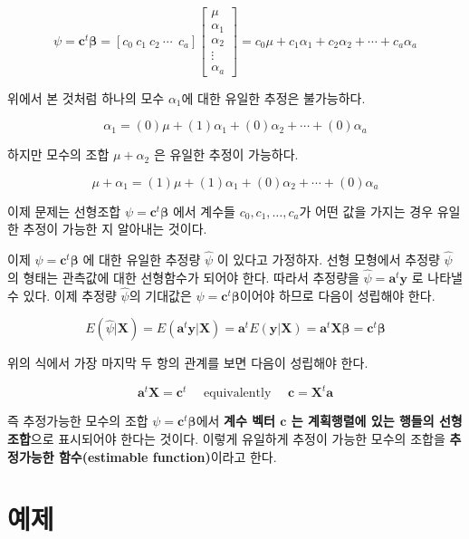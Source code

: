 \documentclass[
]{book}
\newcommand{\bm}[1]{\boldsymbol{\mathbf{#1}}}
\begin{document}
\[ \psi = \bm c^t \bm \beta = 
[ c_0~ c_1~ c_2~ \cdots~~c_a] 
\begin{bmatrix}
\mu \\
\alpha_1 \\
\alpha_2 \\
\vdots \\
\alpha_a
\end{bmatrix}
=c_0 \mu + c_1 \alpha_1 + c_2 \alpha_2 + \cdots + c_a \alpha_a \]

위에서 본 것처럼 하나의 모수 \(\alpha_1\)에 대한 유일한 추정은 불가능하다.

\[  \alpha_1 = (0) \mu + (1) \alpha_1 + (0) \alpha_2 + \cdots + (0) \alpha_a \]

하지만 모수의 조합 \(\mu+ \alpha_2\) 은 유일한 추정이 가능하다.

\[  \mu + \alpha_1 = (1) \mu + (1) \alpha_1 + (0) \alpha_2 + \cdots + (0) \alpha_a \]

이제 문제는 선형조합 \(\psi= \bm c^t \bm \beta\) 에서 계수들 \(c_0, c_1, \dots, c_a\)가 어떤 값을 가지는 경우 유일한 추정이 가능한 지 알아내는 것이다.

이제 \(\psi = \bm c^t \bm \beta\) 에 대한 유일한 추정량 \(\hat \psi\) 이 있다고 가정하자. 선형 모형에서 추정량 \(\hat \psi\)의 형태는 관측값에 대한 선형함수가 되어야 한다. 따라서 추정량을 \(\hat \psi = \bm a^t \bm y\) 로 나타낼 수 있다. 이제 추정량 \(\hat \psi\)의 기대값은 \(\psi=\bm c^t \bm \beta\)이어야 하므로 다음이 성립해야 한다.

\[ E(\hat \psi| \bm X) = E(\bm a^t \bm y| \bm X) = \bm a^t E(\bm y| \bm X) = \bm a^t \bm X \bm \beta = \bm c^t \bm \beta \]

위의 식에서 가장 마지막 두 항의 관계를 보면 다음이 성립해야 한다.

\begin{equation}
\bm a^t \bm X = \bm c^t  \quad \text{ equivalently }\quad \bm c = \bm X^t \bm a
\label{eq:estimable}
\end{equation}

즉 추정가능한 모수의 조합 \(\psi = \bm c^t \bm \beta\)에서 \textbf{계수 벡터 \(\bm c\) 는 계획행렬에 있는 행들의 선형 조합}으로 표시되어야 한다는 것이다. 이렇게 유일하게 추정이 가능한
모수의 조합을 \textbf{추정가능한 함수(estimable function)}이라고 한다.

\hypertarget{uxc608uxc81c}{%
\section{예제}\label{uxc608uxc81c}}
\end{document}
